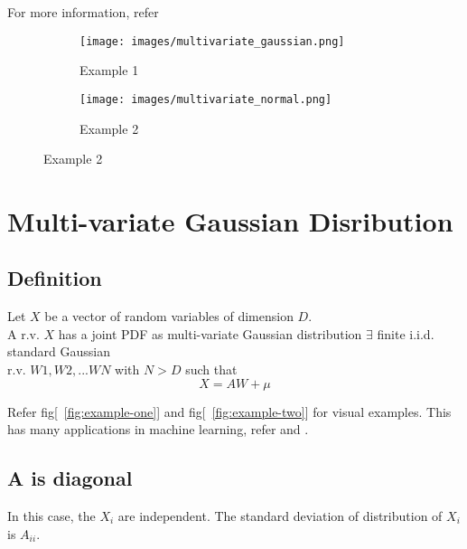 \documentclass{article}
\begin{document}
For more information, refer \cite{1}
\begin{figure}[h!]
    \centering
    \begin{subfigure}{0.5\textwidth}
        \texttt{[image: images/multivariate\_gaussian.png]}
        \caption{Example 1}
        \label{fig:figure_1}
    \end{subfigure}
    \begin{subfigure}{0.5\textwidth}
        \texttt{[image: images/multivariate\_normal.png]}
        \caption{Example 2}
        \label{fig:figure_2}
    \end{subfigure}
\end{figure}
\section{Multi-variate Gaussian Disribution}
\subsection{Definition}
Let $X$ be a vector of random variables of dimension $D$.
\\A r.v. $X$ has a joint PDF as multi-variate Gaussian distribution $\exists$ finite i.i.d. standard Gaussian
\\r.v. $W1, W2, . . . WN$ with $N > D$ such that
\[X=AW+\mu\]

Refer fig[~\ref{fig:example-one}] and fig[~\ref{fig:example-two}] for visual examples. This has many applications in machine learning, refer
\cite{3} and \cite{2}.

\subsection{A is diagonal}
In this case, the $X_{i}$ are independent. The standard deviation of distribution of $X_{i}$ is $A_{ii}$.
\end{document}
